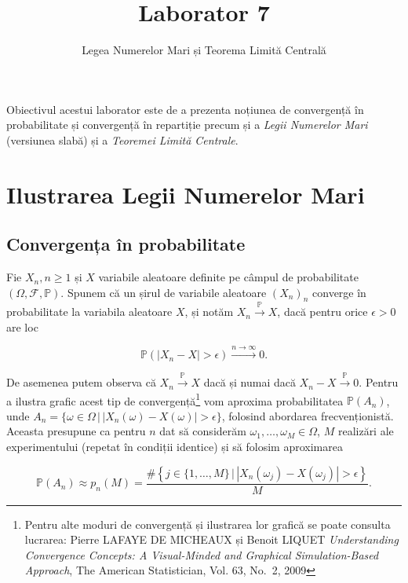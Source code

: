 \documentclass[
]{article}
\title{Laborator 7}
\subtitle{Legea Numerelor Mari și Teorema Limită Centrală}
\author{}
\date{\vspace{-2.5em}}
\begin{document}
\maketitle

\thispagestyle{fancy}

Obiectivul acestui laborator este de a prezenta noțiunea de convergență
în probabilitate și convergență în repartiție precum și a \emph{Legii
Numerelor Mari} (versiunea slabă) și a \emph{Teoremei Limită Centrale}.

\hypertarget{ilustrarea-legii-numerelor-mari}{%
\section{Ilustrarea Legii Numerelor
Mari}\label{ilustrarea-legii-numerelor-mari}}

\hypertarget{convergenux21ba-uxeen-probabilitate}{%
\subsection{Convergența în
probabilitate}\label{convergenux21ba-uxeen-probabilitate}}

Fie \(X_n, n\geq 1\) și \(X\) variabile aleatoare definite pe câmpul de
probabilitate \((\Omega, \mathcal{F}, \mathbb{P})\). Spunem că un șirul
de variabile aleatoare \((X_n)_n\) converge în probabilitate la
variabila aleatoare \(X\), și notăm \(X_n\overset{\mathbb{P}}{\to}X\),
dacă pentru orice \(\epsilon>0\) are loc

\[
  \mathbb{P}\left(\left|X_{n} - X\right| > \epsilon\right) \overset{n\to\infty}{\longrightarrow} 0. 
\]

De asemenea putem observa că \(X_n\overset{\mathbb{P}}{\to}X\) dacă și
numai dacă \(X_n-X\overset{\mathbb{P}}{\to}0\). Pentru a ilustra grafic
acest tip de convergență\footnote{Pentru alte moduri de convergență și
  ilustrarea lor grafică se poate consulta lucrarea: Pierre LAFAYE DE
  MICHEAUX și Benoit LIQUET \emph{Understanding Convergence Concepts: A
  Visual-Minded and Graphical Simulation-Based Approach}, The American
  Statistician, Vol. 63, No.~2, 2009} vom aproxima probabilitatea
\(\mathbb{P}(A_n)\), unde
\(A_n = \{\omega\in\Omega\,|\,\left|X_{n}(\omega) - X(\omega)\right| > \epsilon\}\),
folosind abordarea frecvenționistă. Aceasta presupune ca pentru \(n\)
dat să considerăm \(\omega_1, \ldots,\omega_M\in\Omega\), \(M\)
realizări ale experimentului (repetat în condiții identice) și să
folosim aproximarea

\[
  \mathbb{P}(A_n) \approx p_n(M) = \frac{\#\left\{j\in\{1,\ldots,M\}\,|\,\left|X_{n}(\omega_j) - X(\omega_j)\right| > \epsilon\right\}}{M}.
\]
\end{document}
